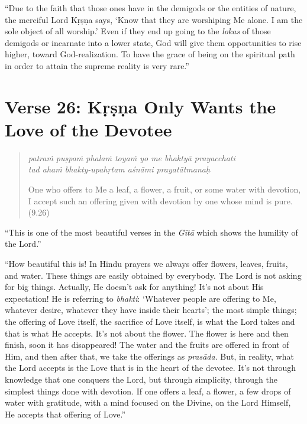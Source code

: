 \documentclass[12pt, twoside, openright]{memoir}
\begin{document}
\enquote{Due to the faith that those ones have in the demigods or the entities of nature, the merciful Lord Kṛṣṇa says, \enquote{Know that they are worshiping Me alone. I am the sole object of all worship.} Even if they end up going to the \textit{lokas} of those demigods or incarnate into a lower state, God will give them opportunities to rise higher, toward God-realization. To have the grace of being on the spiritual path in order to attain the supreme reality is very rare.}

\section{Verse 26: Kṛṣṇa Only Wants the Love of the Devotee}\label{sec-verse-26-krsna-only-wants-the-love-of-the-devotee}


\par
\begin{verse}
\textit{patraṁ puṣpaṁ phalaṁ toyaṁ yo me bhaktyā prayacchati} \\
\textit{tad ahaṁ bhakty-upahṛtam aśnāmi prayatātmanaḥ}

\noindent One who offers to Me a leaf, a flower, a fruit, or some water with devotion, I accept such an offering given with devotion by one whose mind is pure. (9.26)
\end{verse}
\par


\enquote{This is one of the most beautiful verses in the \textit{Gītā} which shows the humility of the Lord.}

\enquote{How beautiful this is! In Hindu prayers we always offer flowers, leaves, fruits, and water. These things are easily obtained by everybody. The Lord is not asking for big things. Actually, He doesn’t ask for anything! It’s not about His expectation! He is referring to \textit{bhakti}: \enquote{Whatever people are offering to Me, whatever desire, whatever they have inside their hearts}; the most simple things; the offering of Love itself, the sacrifice of Love itself, is what the Lord takes and that is what He accepts. It’s not about the flower. The flower is here and then finish, soon it has disappeared! The water and the fruits are offered in front of Him, and then after that, we take the offerings as \textit{prasāda}. But, in reality, what the Lord accepts is the Love that is in the heart of the devotee. It’s not through knowledge that one conquers the Lord, but through simplicity, through the simplest things done with devotion. If one offers a leaf, a flower, a few drops of water with gratitude, with a mind focused on the Divine, on the Lord Himself, He accepts that offering of Love.}
\end{document}

